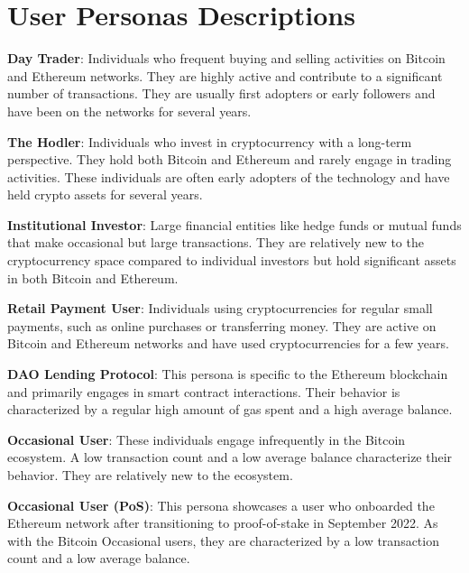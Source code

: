 \documentclass[11pt]{report}
\begin{document}
\chapter{User Personas Descriptions \label{appendix:user_personas_desc}}

\textbf{Day Trader}: Individuals who frequent buying and selling activities on Bitcoin and Ethereum networks. They are highly active and contribute to a significant number of transactions. They are usually first adopters or early followers and have been on the networks for several years.

\textbf{The Hodler}: Individuals who invest in cryptocurrency with a long-term perspective. They hold both Bitcoin and Ethereum and rarely engage in trading activities. These individuals are often early adopters of the technology and have held crypto assets for several years.

\textbf{Institutional Investor}: Large financial entities like hedge funds or mutual funds that make occasional but large transactions. They are relatively new to the cryptocurrency space compared to individual investors but hold significant assets in both Bitcoin and Ethereum.

\textbf{Retail Payment User}: Individuals using cryptocurrencies for regular small payments, such as online purchases or transferring money. They are active on Bitcoin and Ethereum networks and have used cryptocurrencies for a few years.

\textbf{DAO Lending Protocol}: This persona is specific to the Ethereum blockchain and primarily engages in smart contract interactions. Their behavior is characterized by a regular high amount of gas spent and a high average balance.

\textbf{Occasional User}: These individuals engage infrequently in the Bitcoin ecosystem. A low transaction count and a low average balance characterize their behavior. They are relatively new to the ecosystem.

\textbf{Occasional User (PoS)}: This persona showcases a user who onboarded the Ethereum network after transitioning to proof-of-stake in September 2022. As with the Bitcoin Occasional users, they are characterized by a low transaction count and a low average balance.

\end{document}
